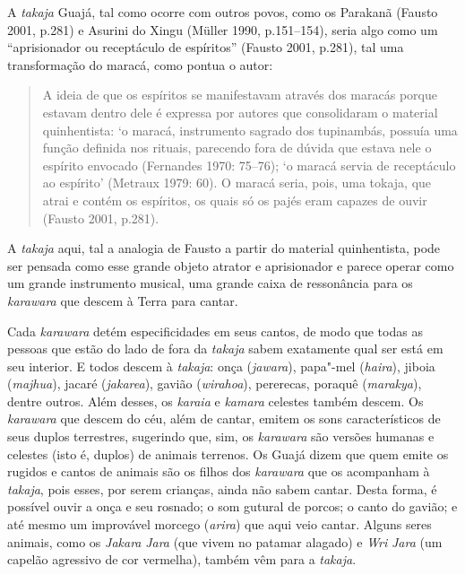 A \emph{takaja} Guajá, tal como ocorre com outros povos, como os
Parakanã (Fausto 2001, p.281) e Asurini do Xingu (Müller 1990,
p.151--154), seria algo como um ``aprisionador ou receptáculo de
espíritos'' (Fausto 2001, p.281), tal uma transformação do maracá, como
pontua o autor:

\begin{quote}
A ideia de que os espíritos se manifestavam através dos maracás porque
estavam dentro dele é expressa por autores que consolidaram o material
quinhentista: `o maracá, instrumento sagrado dos tupinambás, possuía uma
função definida nos rituais, parecendo fora de dúvida que estava nele o
espírito envocado (Fernandes 1970: 75--76); `o maracá servia de
receptáculo ao espírito' (Metraux 1979: 60). O maracá seria, pois, uma
tokaja, que atrai e contém os espíritos, os quais só os pajés eram
capazes de ouvir (Fausto 2001, p.281).
\end{quote}

A \emph{takaja} aqui, tal a analogia de Fausto a partir do material
quinhentista, pode ser pensada como esse grande objeto atrator e
aprisionador e parece operar como um grande instrumento musical, uma
grande caixa de ressonância para os \emph{karawara} que descem à Terra
para cantar.

Cada \emph{karawara} detém especificidades em seus cantos, de modo que
todas as pessoas que estão do lado de fora da \emph{takaja} sabem
exatamente qual ser está em seu interior. E todos descem à
\emph{takaja}: onça (\emph{jawara}), papa"-mel (\emph{haira}), jiboia
(\emph{majhua}), jacaré (\emph{jakarea}), gavião (\emph{wirahoa}),
pererecas, poraquê (\emph{marakya}), dentre outros. Além desses, os
\emph{karaia} e \emph{kamara} celestes também descem. Os \emph{karawara}
que descem do céu, além de cantar, emitem os sons característicos de
seus duplos terrestres, sugerindo que, sim, os \emph{karawara} são
versões humanas e celestes (isto é, duplos) de animais terrenos. Os
Guajá dizem que quem emite os rugidos e cantos de animais são os filhos
dos \emph{karawara} que os acompanham à \emph{takaja}, pois esses, por
serem crianças, ainda não sabem cantar. Desta forma, é possível ouvir a
onça e seu rosnado; o som gutural de porcos; o canto do gavião; e até
mesmo um improvável morcego (\emph{arira}) que aqui veio cantar. Alguns
seres animais, como os \emph{Jakara} \emph{Jara} (que vivem no patamar
alagado) e \emph{Wri} \emph{Jara} (um capelão agressivo de cor
vermelha), também vêm para a \emph{takaja}.

